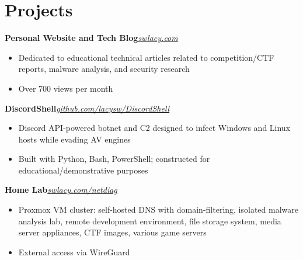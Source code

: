 \documentclass{article}
\newcommand{\topLevelProjectItem}[2]{
    \textbf{#1}\hfill \emph{#2}\newline
    \vspace{-18pt}\begin{itemize}
}
\newcommand{\topLevelItemEnd}{\end{itemize}\vspace{5pt}}
\newcommand{\lowLevelItem}[1]{
    \item\small{#1}\vspace{-8pt}
}
\begin{document}
    \section*{Projects}
        \topLevelProjectItem{Personal Website and Tech Blog}{\href{https://swlacy.com}{swlacy.com}}
            \lowLevelItem{Dedicated to educational technical articles related to competition/CTF reports, malware analysis, and security research}
            \lowLevelItem{Over 700 views per month}
        \topLevelItemEnd
        \topLevelProjectItem{DiscordShell}{\href{https://github.com/lacysw/DiscordShell}{github.com/lacysw/DiscordShell}}
            \lowLevelItem{Discord API-powered botnet and C2 designed to infect Windows and Linux hosts while evading AV engines}
            \lowLevelItem{Built with Python, Bash, PowerShell; constructed for educational/demonstrative purposes}
        \topLevelItemEnd
        \topLevelProjectItem{Home Lab}{\href{https://github.com/lacysw/DiscordShell}{\href{https://swlacy.com/netdiag}{swlacy.com/netdiag}}}
            \lowLevelItem{Proxmox VM cluster: self-hosted DNS with domain-filtering, isolated malware analysis lab, remote development environment, file storage system, media server appliances, CTF images, various game servers}
            \lowLevelItem{External access via WireGuard}
        \topLevelItemEnd
\end{document}
